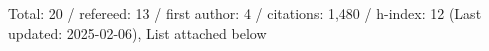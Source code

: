 Total: 20 / refereed: 13 / first author: 4 / citations: 1,480 / h-index: 12 (Last updated: 2025-02-06), List attached below